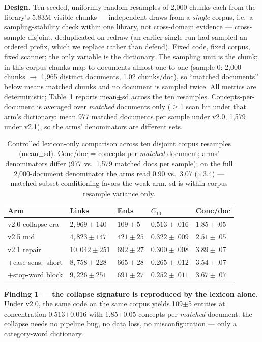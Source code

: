 \documentclass[sigconf,nonacm,anonymous]{acmart}
\begin{document}
\textbf{Design.} Ten seeded, uniformly random resamples of 2{,}000
chunks each from the library's 5.83M visible chunks --- independent
draws from a \emph{single} corpus, i.e.\ a sampling-stability check
within one library, not cross-domain evidence --- cross-sample disjoint,
deduplicated on redraw (an earlier single run had sampled an ordered
prefix, which we replace rather than defend). Fixed code, fixed corpus,
fixed scanner; the only variable is the dictionary. The sampling unit
is the chunk; in this corpus chunks map to documents almost
one-to-one (sample 0: 2{,}000 chunks $\to$ 1{,}965 distinct
documents, 1.02 chunks/doc), so ``matched documents'' below means
matched chunks and no document is sampled twice. All metrics are
deterministic; Table~\ref{tab:lexiso} reports mean$\pm$sd across the
ten resamples. Concepts-per-document is averaged over \emph{matched}
documents only ($\geq$1 scan hit under that arm's dictionary: mean 977
matched documents per sample under v2.0, 1{,}579 under v2.1), so the
arms' denominators are different sets.

\begin{table}[t]
\centering
\caption{Controlled lexicon-only comparison across ten disjoint corpus
resamples (mean$\pm$sd). Conc/doc = concepts per \emph{matched} document;
arms' denominators differ (977 vs.\ 1{,}579 matched docs per sample);
on the full 2{,}000-document denominator the arms read 0.90 vs.\ 3.07
(${\times}$3.4) --- matched-subset conditioning favors the weak arm.
sd is within-corpus resample variance only.}
\label{tab:lexiso}
\footnotesize
\begin{tabularx}{\columnwidth}{@{}lXXXX@{}}
\toprule
Arm & Links & Ents & $C_{10}$ & Conc/doc \\
\midrule
v2.0 collapse-era & $2{,}969\pm140$ & $109\pm5$ & $0.513\pm.016$ & $1.85\pm.05$ \\
v2.5 mid & $4{,}823\pm147$ & $421\pm25$ & $0.322\pm.009$ & $2.51\pm.05$ \\
v2.1 repair & $10{,}042\pm251$ & $692\pm27$ & $0.300\pm.008$ & $\mathbf{3.89\pm.07}$ \\
\;+case-sens.\ short & $8{,}758\pm228$ & $665\pm28$ & $0.265\pm.012$ & $3.54\pm.07$ \\
\;+stop-word block & $9{,}226\pm251$ & $691\pm27$ & $\mathbf{0.252\pm.011}$ & $3.67\pm.07$ \\
\bottomrule
\end{tabularx}
\end{table}

\textbf{Finding 1 --- the collapse signature is reproduced by the lexicon
alone.} Under v2.0, the same code on the same corpus yields 109$\pm$5
entities at concentration 0.513$\pm$0.016 with 1.85$\pm$0.05 concepts per
\emph{matched} document: the collapse needs no pipeline bug, no data loss, no
misconfiguration --- only a category-word dictionary.
\end{document}
